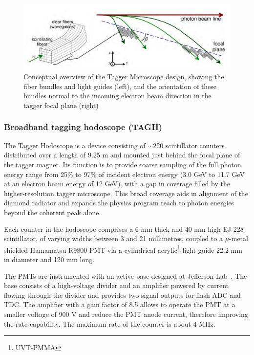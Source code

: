 \begin{figure}[ht]
\begin{center}
 \includegraphics[clip=true,width=0.95\linewidth]{figures/TAGM_conceptual.pdf}
\end{center}
\caption{Conceptual overview of the Tagger Microscope design, showing the fiber bundles and light guides (left), and the orientation of these bundles normal to the incoming electron beam direction in the tagger focal plane (right)
        }
\label{fig:TAGM_conceptual} 
\end{figure}

\subsubsection{Broadband tagging hodoscope (TAGH)}\label{sec:TAGHIntro}
The Tagger Hodoscope is a device consisting of $\sim$220 scintillator counters distributed over a length of 9.25 m and mounted just behind the focal plane of the tagger magnet.
Its function is to provide coarse sampling of the full photon energy range from 25\% to 97\% of incident electron energy (3.0 GeV to 11.7 GeV at an electron beam energy of 12 GeV), with a gap in coverage filled by the higher-resolution tagger microscope.
This broad coverage aids in alignment of the diamond radiator and expands the \GX{} physics program reach to photon energies beyond the coherent peak alone.

Each counter in the hodoscope comprises a 6 mm thick and 40 mm high EJ-228 scintillator, of varying widths between 3 and 21 millimetres, coupled to a $\mu$-metal shielded Hamamatsu R9800 PMT via a cylindrical acrylic\footnote{UVT-PMMA} light guide 22.2 mm in diameter and 120 mm long.

The PMTs are instrumented with an active base designed at Jefferson Lab~\cite{tagh:base}. The base consists of a high-voltage divider and an amplifier powered by current flowing through the divider and provides two signal outputs for flash ADC and TDC.
The amplifier with a gain factor of 8.5 allows to operate the PMT at  a smaller voltage of 900 V and reduce the PMT anode current, therefore improving the rate capability. The maximum rate of the counter is about 4 MHz.

